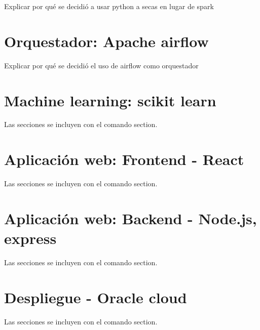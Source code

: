 Explicar por qué se decidió a usar python a secas en lugar de spark

\section{Orquestador: Apache airflow}

Explicar por qué se decidió el uso de airflow como orquestador

\section{Machine learning: scikit learn}

Las secciones se incluyen con el comando section.

\section{Aplicación web: Frontend - React}

Las secciones se incluyen con el comando section.

\section{Aplicación web: Backend - Node.js, express}

Las secciones se incluyen con el comando section.

\section{Despliegue - Oracle cloud}

Las secciones se incluyen con el comando section.
